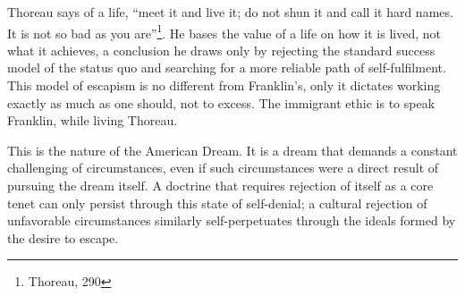 Thoreau says of a life, ``meet it and live it; do not shun it and call it hard
names. It is not so bad as you are''\footnote{Thoreau, 290}. He bases the value
of a life on how it is lived, not what it achieves, a conclusion he draws only
by rejecting the standard success model of the status quo and searching for a
more reliable path of self-fulfilment. This model of escapism is no different
from Franklin's, only it dictates working exactly as much as one should, not to
excess.  The immigrant ethic is to speak Franklin, while living Thoreau.

This is the nature of the American Dream. It is a dream that demands a constant
challenging of circumstances, even if such circumstances were a direct result of
pursuing the dream itself. A doctrine that requires rejection of itself as a
core tenet can only persist through this state of self-denial; a cultural
rejection of unfavorable circumstances similarly self-perpetuates through the
ideals formed by the desire to escape.
